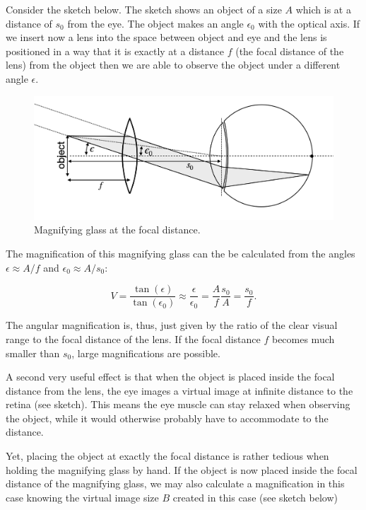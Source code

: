 \documentclass[
  a4paper,
]{book}
\begin{document}
Consider the sketch below. The sketch shows an object of a size \(A\)
which is at a distance of \(s_0\) from the eye. The object makes an
angle \(\epsilon_0\) with the optical axis. If we insert now a lens into
the space between object and eye and the lens is positioned in a way
that it is exactly at a distance \(f\) (the focal distance of the lens)
from the object then we are able to observe the object under a different
angle \(\epsilon\).

\begin{figure}[H]

{\centering \includegraphics[width=0.6\linewidth,height=\textheight,keepaspectratio]{geometrical-optics/img/magnifying_glass_focal.png}

}

\caption{Magnifying glass at the focal distance.}

\end{figure}%

The magnification of this magnifying glass can the be calculated from
the angles \(\epsilon\approx A/f\) and \(\epsilon_0\approx A/s_0\):

\[
V=\frac{\tan(\epsilon)}{\tan(\epsilon_0)}\approx \frac{\epsilon}{\epsilon_0}=\frac{A}{f}\frac{s_0}{A}=\frac{s_0}{f}.
\]

The angular magnification is, thus, just given by the ratio of the clear
visual range to the focal distance of the lens. If the focal distance
\(f\) becomes much smaller than \(s_0\), large magnifications are
possible.

A second very useful effect is that when the object is placed inside the
focal distance from the lens, the eye images a virtual image at infinite
distance to the retina (see sketch). This means the eye muscle can stay
relaxed when observing the object, while it would otherwise probably
have to accommodate to the distance.

Yet, placing the object at exactly the focal distance is rather tedious
when holding the magnifying glass by hand. If the object is now placed
inside the focal distance of the magnifying glass, we may also calculate
a magnification in this case knowing the virtual image size \(B\)
created in this case (see sketch below)
\end{document}

